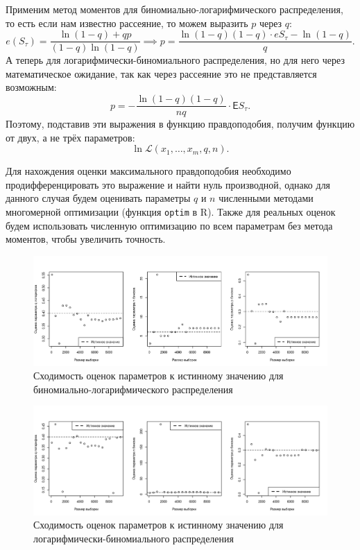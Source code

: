 \documentclass[12pt, specialist, subf, substylefile = spbu_report.rtx]{disser}
\begin{document}
	Применим метод моментов для биномиально-логарифмического распределения, то есть если нам известно рассеяние, то можем выразить $ p $ через $ q $:
	\[
		e (S _\tau)=\frac{\ln(1 - q) + q p}{(1-q)\ln(1 - q)} \implies p = \frac {\ln(1 - q) (1 - q) \cdot eS _\tau - \ln(1 - q)} {q}.
	\]
	А теперь для логарифмически-биномиального распределения, но для него через математическое ожидание, так как через рассеяние это не представляется возможным:
	\[
		p = -\frac {\ln(1 - q)(1 - q)} {nq} \cdot \mathsf{E} S _\tau.
	\]
	Поэтому, подставив эти выражения в функцию правдоподобия, получим функцию от двух, а не трёх параметров:
	\[
		\ln \mathcal{L} (x _1, \dots, x _m, q, n).
	\]
	
	Для нахождения оценки максимального правдоподобия необходимо продифференцировать это выражение и найти нуль производной, однако для данного случая будем оценивать параметры $ q $ и $ n $ численными методами многомерной оптимизации (функция \verb|optim| в R). Также для реальных оценок будем использовать численную оптимизацию по всем параметрам без метода моментов, чтобы увеличить точность.
	
	\begin{figure}[!ht]
		\centering
		\includegraphics[width = 1\textwidth]{binomlogest}
		\caption{Сходимость оценок параметров к истинному значению для биномиально-логарифмического распределения}
		\label{img:binomlogest}
	\end{figure}
	
	\begin{figure}[!ht]
		\centering
		\includegraphics[width = 1\textwidth]{logbinomest}
		\caption{Сходимость оценок параметров к истинному значению для логарифмически-биномиального распределения}
		\label{img:logbinomest}
	\end{figure}
\end{document}
